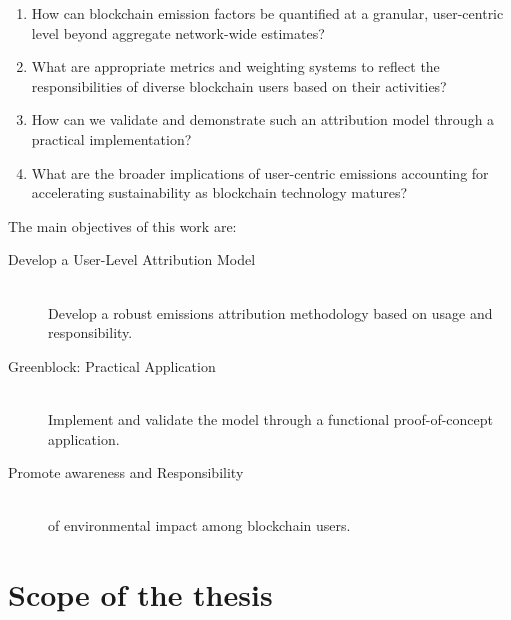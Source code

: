 \documentclass[11pt]{report}
\begin{document}
\begin{enumerate}
    \item How can blockchain emission factors be quantified at a granular, user-centric level beyond aggregate network-wide estimates?
    \item What are appropriate metrics and weighting systems to reflect the responsibilities of diverse blockchain users based on their activities?
    \item How can we validate and demonstrate such an attribution model through a practical implementation?
    \item What are the broader implications of user-centric emissions accounting for accelerating sustainability as blockchain technology matures? 
\end{enumerate}

The main objectives of this work are:

\begin{description}

    \item [Develop a User-Level Attribution Model] \hfill \\
          Develop a robust emissions attribution methodology based on usage and responsibility.
    \item [Greenblock: Practical Application] \hfill \\
          Implement and validate the model through a functional proof-of-concept application.
    \item [Promote awareness and Responsibility] \hfill \\
          of environmental impact among blockchain users.
\end{description}

\section{Scope of the thesis}
\end{document}
